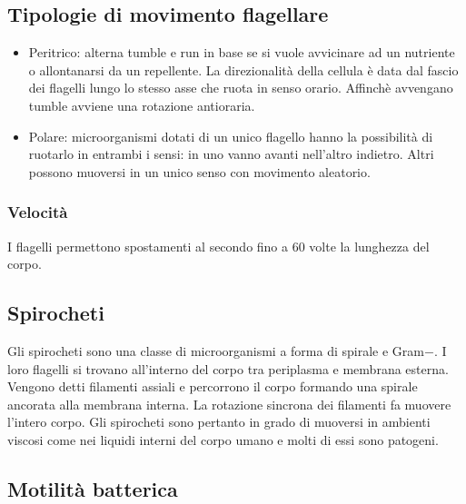 	\subsection{Tipologie di movimento flagellare}
	\begin{multicols}{2}
		\begin{itemize}
			\item Peritrico: alterna tumble e run in base se si vuole avvicinare ad un nutriente o allontanarsi da un repellente.
				La direzionalit\`a della cellula \`e data dal fascio dei flagelli lungo lo stesso asse che ruota in senso orario.
				Affinch\`e avvengano tumble avviene una rotazione antioraria.
			\item Polare: microorganismi dotati di un unico flagello hanno la possibilit\`a di ruotarlo in entrambi i sensi: in uno vanno avanti nell'altro indietro.
				Altri possono muoversi in un unico senso con movimento aleatorio.
		\end{itemize}
	\end{multicols}

		\subsubsection{Velocit\`a}
		I flagelli permettono spostamenti al secondo fino a $60$ volte la lunghezza del corpo.

	\subsection{Spirocheti}
	Gli spirocheti sono una classe di microorganismi a forma di spirale e Gram$-$.
	I loro flagelli si trovano all'interno del corpo tra periplasma e membrana esterna.
	Vengono detti filamenti assiali e percorrono il corpo formando una spirale ancorata alla membrana interna.
	La rotazione sincrona dei filamenti fa muovere l'intero corpo.
	Gli spirocheti sono pertanto in grado di muoversi in ambienti viscosi come nei liquidi interni del corpo umano e molti di essi sono patogeni.

	\subsection{Motilit\`a batterica}

